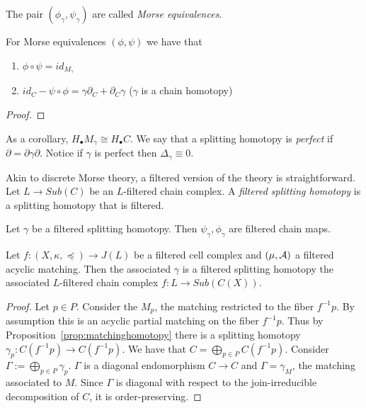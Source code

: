  The pair $(\phi_\gamma,\psi_\gamma)$ are called {\em Morse equivalences}.

\begin{prop}\label{prop:MorseEquiv}
For Morse equivalences $(\phi,\psi)$ we have that 
\begin{enumerate}
\item $\phi\circ \psi = id_{M_\gamma}$
\item $id_C - \psi\circ \phi = \gamma\partial_C + \partial_C \gamma$ ($\gamma$ is a chain homotopy)
\end{enumerate}
\end{prop}
\begin{proof}

\end{proof}

As a corollary, $H_\bullet M_\gamma\cong H_\bullet C$.  We say that a splitting homotopy is {\em perfect} if $\partial = \partial\gamma\partial$.  Notice if $\gamma$ is perfect then $\Delta_\gamma\equiv 0$.%

Akin to discrete Morse theory, a filtered version of the theory is straightforward.  Let $L\to Sub(C)$ be an $L$-filtered chain complex.  A {\em filtered splitting homotopy} is a splitting homotopy that is filtered.


\begin{prop}
Let $\gamma$ be a filtered splitting homotopy.  Then $\psi_\gamma,\phi_\gamma$ are filtered chain maps.
\end{prop}


\begin{prop}
Let $f:(X,\kappa,\preceq)\to J(L)$ be a filtered cell complex and $(\mu,{\mathcal A})$ a filtered acyclic matching.  Then the associated $\gamma$ is a filtered splitting homotopy the associated $L$-filtered chain complex $f:L\to Sub(C(X))$.
\end{prop}
\begin{proof}
Let $p\in P$.  Consider the $M_p$, the matching restricted to the fiber $f^{-1}p$.  By assumption this is an acyclic partial matching on the fiber $f^{-1}p$.  Thus by Proposition~\ref{prop:matchinghomotopy} there is a splitting homotopy $\gamma_p:C(f^{-1}p)\to C(f^{-1}p)$.     We have that $C=\bigoplus_{p\in P} C(f^{-1}p)$.  Consider $\Gamma:= \bigoplus_{p\in P} \gamma_p$.  $\Gamma$ is a diagonal endomorphism $C\to C$ and $\Gamma=\gamma_M$, the matching associated to $M$.  Since $\Gamma$ is diagonal with respect to the join-irreducible decomposition of $C$, it is order-preserving.

\end{proof}

